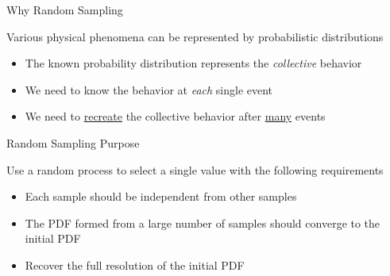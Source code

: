 \documentclass[xcolor=x11names,compress, handouts]{beamer}
\renewcommand{\(}{\begin{columns}}
\renewcommand{\)}{\end{columns}}
\newcommand{\<}[1]{\begin{column}{#1}}
\renewcommand{\>}{\end{column}}
\begin{document}
\begin{frame}{Why Random Sampling}

Various physical phenomena can be
represented by probabilistic distributions

\begin{itemize}
    \item The known probability distribution
represents the \textit{collective} behavior
\vspace*{1em}
    \item We need to know the behavior at \textit{each}
single event
\vspace*{1em}
    \item We need to \underline{recreate} the collective behavior after \underline{many} events
\end{itemize}

\end{frame}


\begin{frame}{Random Sampling Purpose}

Use a random process to select a single
value with the following requirements

\begin{itemize}
    \item Each sample should be independent from
other samples
\vspace*{1em}
    \item The PDF formed from a large number of
samples should converge to the initial PDF
\vspace*{1em}
    \item Recover the full resolution of the initial PDF
\end{itemize}

\end{frame}
\end{document}
